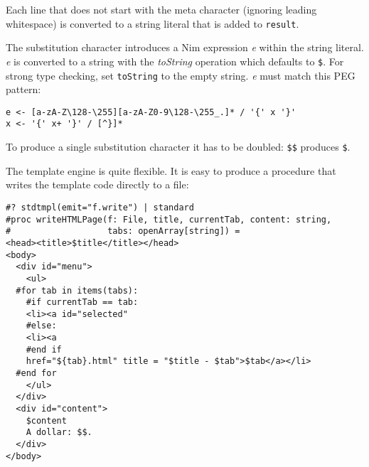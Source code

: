 Each line that does not start with the meta character (ignoring leading
whitespace) is converted to a string literal that is added to
\texttt{result}.

The substitution character introduces a Nim expression \emph{e} within
the string literal. \emph{e} is converted to a string with the
\emph{toString} operation which defaults to \texttt{\$}. For strong type
checking, set \texttt{toString} to the empty string. \emph{e} must match
this PEG pattern:

\begin{verbatim}
e <- [a-zA-Z\128-\255][a-zA-Z0-9\128-\255_.]* / '{' x '}'
x <- '{' x+ '}' / [^}]*
\end{verbatim}

To produce a single substitution character it has to be doubled:
\texttt{\$\$} produces \texttt{\$}.

The template engine is quite flexible. It is easy to produce a procedure
that writes the template code directly to a file:

\begin{verbatim}
#? stdtmpl(emit="f.write") | standard
#proc writeHTMLPage(f: File, title, currentTab, content: string,
#                   tabs: openArray[string]) =
<head><title>$title</title></head>
<body>
  <div id="menu">
    <ul>
  #for tab in items(tabs):
    #if currentTab == tab:
    <li><a id="selected"
    #else:
    <li><a
    #end if
    href="${tab}.html" title = "$title - $tab">$tab</a></li>
  #end for
    </ul>
  </div>
  <div id="content">
    $content
    A dollar: $$.
  </div>
</body>
\end{verbatim}

